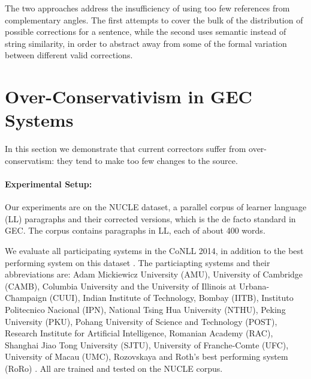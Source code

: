 \documentclass[letter,11pt]{article}
\begin{document}
	The two approaches address the insufficiency of using too few references from
	complementary angles. 
	The first attempts to cover the bulk of the distribution of possible
	corrections for a sentence, while the second
	uses semantic instead of string similarity, in order to abstract away
	from some of the formal variation between different valid corrections.
	
	\section{Over-Conservativism in GEC Systems}\label{sec:formal_conservatism}
	
	
	
	In this section we demonstrate that current correctors
	suffer from over-conservatism: they tend to make too few changes to the source. 
	
	
	\paragraph{Experimental Setup:}\label{par:experimental_setup}
	
	Our experiments are on the NUCLE dataset,
	a parallel corpus of learner language (LL) paragraphs and their corrected versions,
	which is the de facto standard in GEC.
	The corpus contains paragraphs in LL, each of about 400 words.
	
	We evaluate all participating systems in the CoNLL 2014,
	in addition to the best performing system on this dataset \cite{rozovskaya2014building}.
	The particiapting systems and their abbreviations are: Adam Mickiewicz University (AMU),
	University of Cambridge (CAMB), Columbia University and the University of Illinois at Urbana-Champaign (CUUI),
	Indian Institute of Technology, Bombay (IITB), Instituto Politecnico Nacional (IPN),
	National Tsing Hua University (NTHU), Peking University (PKU), Pohang University of Science and Technology (POST),
	Research Institute for Artificial Intelligence, Romanian Academy (RAC), Shanghai Jiao Tong University (SJTU),
	University of Franche-Comte (UFC), University of Macau (UMC),
	Rozovskaya and Roth's best performing system (RoRo) \cite{rozovskaya2016grammatical}.
	All are trained and tested on the NUCLE corpus.
	
\end{document}
